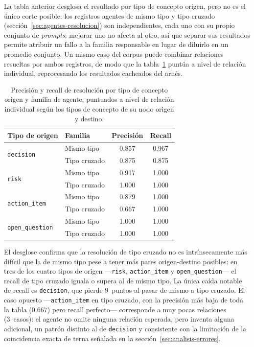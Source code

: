La tabla anterior desglosa el resultado por tipo de concepto origen, pero no es el único corte
posible: los registros agentes de mismo tipo y tipo cruzado (sección~\ref{sec:agentes-resolucion})
son independientes, cada uno con su propio conjunto de \textit{prompts}: mejorar uno no afecta
al otro, así que separar sus resultados permite atribuir un fallo a la familia responsable en lugar
de diluirlo en un promedio conjunto. Un mismo caso del corpus puede combinar relaciones resueltas
por ambos registros, de modo que la tabla~\ref{tab:eval-resolution-same-cross} puntúa a nivel de
relación individual, reprocesando los resultados cacheados del arnés.

\begin{table}[H]
  \centering
  \begin{tabular}{llcc}
    \toprule
    \textbf{Tipo de origen} & \textbf{Familia} & \textbf{Precisión} & \textbf{Recall} \\
    \midrule
    \multirow{2}{*}{\texttt{decision}}       & Mismo tipo   & 0.857 & 0.967 \\
                                              & Tipo cruzado & 0.875 & 0.875 \\
    \multirow{2}{*}{\texttt{risk}}           & Mismo tipo   & 0.917 & 1.000 \\
                                              & Tipo cruzado & 1.000 & 1.000 \\
    \multirow{2}{*}{\texttt{action\_item}}   & Mismo tipo   & 0.879 & 1.000 \\
                                              & Tipo cruzado & 0.667 & 1.000 \\
    \multirow{2}{*}{\texttt{open\_question}} & Mismo tipo   & 1.000 & 1.000 \\
                                              & Tipo cruzado & 1.000 & 1.000 \\
    \bottomrule
  \end{tabular}
  \caption{Precisión y recall de resolución por tipo de concepto origen y familia de agente,
           puntuados a nivel de relación individual según los tipos de concepto de su nodo origen
           y destino.}
  \label{tab:eval-resolution-same-cross}
\end{table}

El desglose confirma que la resolución de tipo cruzado no es intrínsecamente más difícil que la de
mismo tipo pese a tener más pares origen-destino posibles: en tres de los cuatro tipos de origen
—\texttt{risk}, \texttt{action\_item} y \texttt{open\_question}— el recall de tipo cruzado iguala o
supera al de mismo tipo. La única caída notable de recall es \texttt{decision}, que pierde 9~puntos
al pasar de mismo a tipo cruzado. El caso opuesto —\texttt{action\_item} en tipo cruzado, con la
precisión más baja de toda la tabla (0.667) pero recall perfecto— corresponde a muy pocas relaciones
(3~casos): el agente no omite ninguna relación esperada, pero inventa alguna adicional, un patrón
distinto al de \texttt{decision} y consistente con la limitación de la coincidencia exacta de terna
señalada en la sección~\ref{sec:analisis-errores}.

